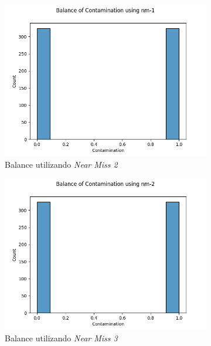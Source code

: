 \begin{figure}[!ht]
\begin{subfigure}[b]{0.3\textwidth}
        \centering
        \includegraphics[width=\textwidth]{media/images/under-sampling/nm-1.png}
        \caption{Balance utilizando \textit{Near Miss 2}}
    \end{subfigure}
    \begin{subfigure}[b]{0.3\textwidth}
        \centering
        \includegraphics[width=\textwidth]{media/images/under-sampling/nm-2.png}
        \caption{Balance utilizando \textit{Near Miss 3}}
    \end{subfigure}
    \begin{subfigure}[b]{0.3\textwidth}
        \centering

\end{subfigure}
\end{figure}
